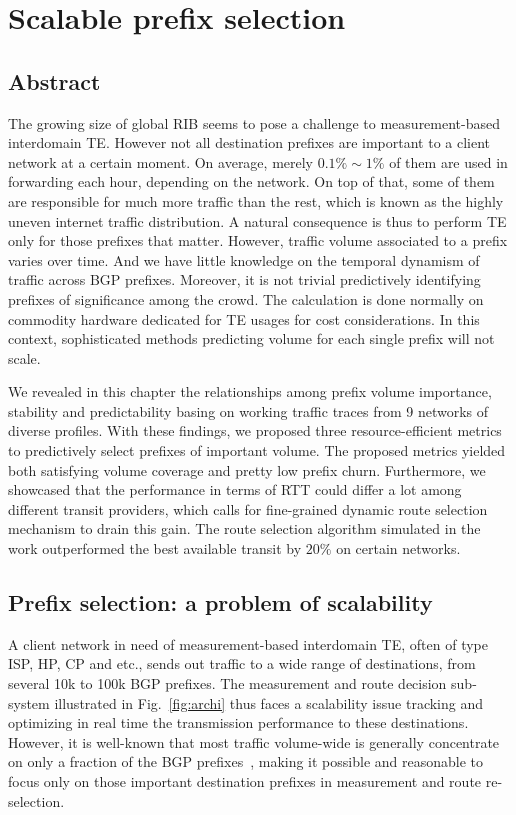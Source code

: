 \chapter{Scalable prefix selection}
\label{sec:pref_selec}

\section*{Abstract}
The growing size of global \acf{RIB} seems to pose a challenge to measurement-based interdomain \acf{TE}. However not all destination prefixes are important to a client network at a certain moment. On average, merely $0.1\% \sim 1\%$ of them are used in forwarding each hour, depending on the network. On top of that, some of them are responsible for much more traffic than the rest, which is known as the highly uneven internet traffic distribution.
A natural consequence is thus to perform TE only for those prefixes that matter.
However, traffic volume associated to a prefix varies over time. And we have little knowledge on the temporal dynamism of traffic across \acf{BGP} prefixes. 
Moreover, it is not trivial predictively identifying prefixes of significance among the crowd.
The calculation is done normally on commodity hardware dedicated for \ac{TE} usages for cost considerations.
In this context, sophisticated methods predicting volume for each single prefix will not scale.

We revealed in this chapter the relationships among prefix volume importance, stability and predictability basing on working traffic traces from 9 networks of diverse profiles. 
With these findings, we proposed three resource-efficient metrics to predictively select prefixes of important volume. The proposed metrics yielded both satisfying volume coverage and pretty low prefix churn. Furthermore, we showcased that the performance in terms of RTT could differ a lot among different transit providers, which calls for fine-grained dynamic route selection mechanism to drain this gain. The route selection algorithm simulated in the work outperformed the best available transit by $20\%$ on certain networks. 
\clearpage

\section{Prefix selection: a problem of scalability}
A client network in need of measurement-based interdomain \acf{TE}, often of type \acf{ISP}, \acf{HP}, \acf{CP} and etc., sends out traffic to a wide range of destinations, from several 10k to 100k BGP prefixes.
The measurement and route decision sub-system illustrated in Fig.~\ref{fig:archi} thus faces a scalability issue tracking and optimizing in real time the transmission performance to these destinations.
However, it is well-known that most traffic volume-wide is generally concentrate on only a fraction of the BGP prefixes~\cite{Fang1999, Feamster2003, Papagiannaki2005, Sarrar2012}, 
making it possible and reasonable to focus only on those important destination prefixes in measurement and route re-selection. 

